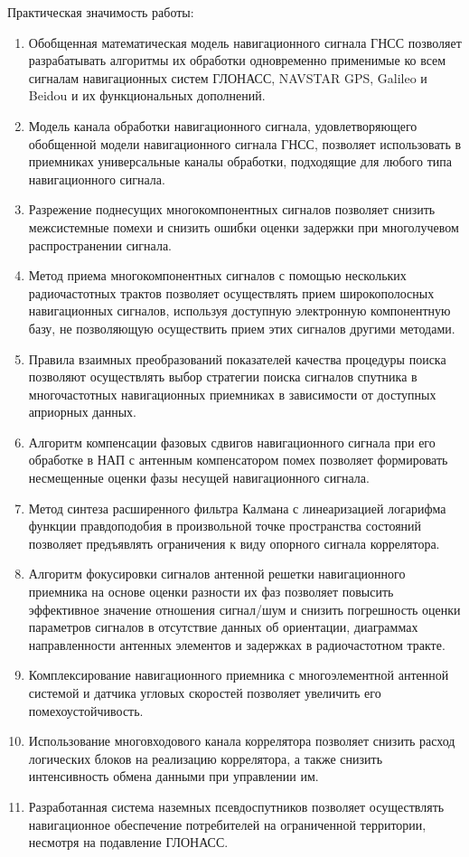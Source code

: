 Практическая значимость работы:
\begin{enumerate}
\item Обобщенная математическая модель навигационного сигнала ГНСС позволяет разрабатывать алгоритмы их обработки одновременно применимые ко всем сигналам навигационных систем ГЛОНАСС, NAVSTAR GPS, Galileo и Beidou и их функциональных дополнений.
\item Модель канала обработки навигационного сигнала, удовлетворяющего обобщенной модели навигационного сигнала ГНСС, позволяет использовать в приемниках универсальные каналы обработки, подходящие для любого типа навигационного сигнала. 
\item Разрежение поднесущих многокомпонентных сигналов позволяет снизить межсистемные помехи и снизить ошибки оценки задержки при многолучевом распространении сигнала.
\item Метод приема многокомпонентных сигналов с помощью нескольких радиочастотных трактов позволяет осуществлять прием широкополосных навигационных сигналов, используя доступную электронную компонентную базу, не позволяющую осуществить прием этих сигналов другими методами.
\item Правила взаимных преобразований показателей качества процедуры поиска позволяют осуществлять выбор стратегии поиска сигналов спутника в многочастотных навигационных приемниках в зависимости от доступных априорных данных. 
\item Алгоритм компенсации фазовых сдвигов навигационного сигнала при его обработке в НАП с антенным компенсатором помех позволяет формировать несмещенные оценки фазы несущей навигационного сигнала. 
\item Метод синтеза расширенного фильтра Калмана с линеаризацией логарифма функции правдоподобия в произвольной точке пространства состояний позволяет предъявлять ограничения к виду опорного сигнала коррелятора.
\item Алгоритм фокусировки сигналов антенной решетки навигационного приемника на основе оценки разности их фаз позволяет повысить эффективное значение отношения сигнал/шум и снизить погрешность оценки параметров сигналов в отсутствие данных об ориентации, диаграммах направленности антенных элементов и задержках в радиочастотном тракте.
\item Комплексирование навигационного приемника с многоэлементной антенной системой и датчика угловых скоростей позволяет увеличить его помехоустойчивость. 
\item Использование многовходового канала коррелятора позволяет снизить расход логических блоков на реализацию коррелятора, а также снизить интенсивность обмена данными при управлении им. 
\item Разработанная система наземных псевдоспутников позволяет осуществлять навигационное обеспечение потребителей на ограниченной территории, несмотря на подавление ГЛОНАСС.
\end{enumerate}





